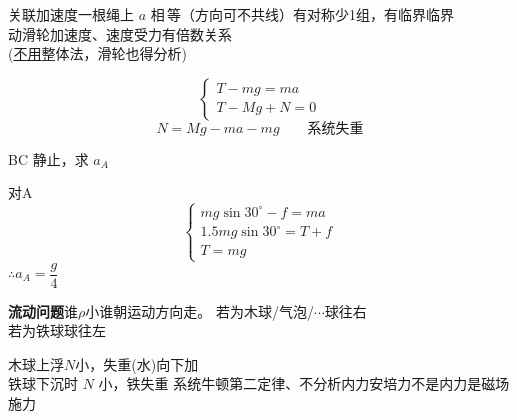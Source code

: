 \medskip
\noindent 关联加速度\quad 一根绳上 $a$ 相\,等（方向可不共线）\qquad 有对称少1组，有临界临界 \\
动滑轮加速度、速度受力有倍数关系 \\
(\underline{不用}整体法，滑轮也得分析)
\begin{problem}
\begin{solution}
\[ \begin{cases} T-mg=ma\\ T-Mg+N=0\end{cases} \]
\[ N=Mg-ma-mg\qquad\text{系统失重} \]
\end{solution}
\end{problem}
\begin{problem}
BC 静止，求 $a_A$
\begin{solution}
对A
\[ \begin{cases} mg\sin30^\circ-f=ma\\ 1.5mg\sin30^\circ=T+f\\ T=mg\end{cases} \]
$\therefore a_A=\dfrac g4$
\end{solution}
\end{problem}
\textbf{流动问题}\quad 谁$\rho$小谁朝运动方向走。
\noindent 若为木球/气泡/$\cdots$\quad 球往右 \\
若为铁球\quad 球往左

\noindent 木球上浮\quad $N$小，失重(水)向下加
\\
铁球下沉时 $N$ 小，铁失重
\noindent 系统牛顿第二定律、不分析内力\quad 安培力\quad 不是内力是磁场施力


